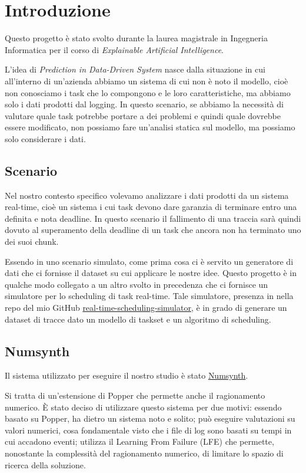 \chapter{Introduzione}
Questo progetto è stato svolto durante la laurea magistrale in Ingegneria Informatica per il corso di \textit{Explainable Artificial Intelligence}.

L'idea di \textit{Prediction in Data-Driven System} nasce dalla situazione in cui all'interno di un'azienda abbiamo un sistema di cui non è noto il modello, cioè non conosciamo i task che lo compongono e le loro caratteristiche, ma abbiamo solo i dati prodotti dal logging. In questo scenario, se abbiamo la necessità di valutare quale task potrebbe portare a dei problemi e quindi quale dovrebbe essere modificato, non possiamo fare un'analisi statica sul modello, ma possiamo solo considerare i dati.

\section{Scenario}
Nel nostro contesto specifico volevamo analizzare i dati prodotti da un sistema real-time, cioè un sistema i cui task devono dare garanzia di terminare entro una definita e nota deadline. In questo scenario il fallimento di una traccia sarà quindi dovuto al superamento della deadline di un task che ancora non ha terminato uno dei suoi chunk.

Essendo in uno scenario simulato, come prima cosa ci è servito un generatore di dati che ci fornisse il dataset su cui applicare le nostre idee. Questo progetto è in qualche modo collegato a un altro svolto in precedenza che ci fornisce un simulatore per lo scheduling di task real-time. Tale simulatore, presenza in nella repo del mio GitHub \href{https://github.com/edoardosarri24/real-time-scheduling-simulator}{real-time-scheduling-simulator}, è in grado di generare un dataset di tracce dato un modello di taskset e un algoritmo di scheduling.

\section{Numsynth}
\label{sec:numsynth}
Il sistema utilizzato per eseguire il nostro studio è stato \href{https://github.com/celinehocquette/numsynth-aaai23}{Numsynth}.

Si tratta di un'estensione di Popper che permette anche il ragionamento numerico. È stato deciso di utilizzare questo sistema per due motivi: essendo basato su Popper, ha dietro un sistema noto e solito; può eseguire valutazioni su valori numerici, cosa fondamentale visto che i file di log sono basati su tempi in cui accadono eventi; utilizza il Learning From Failure (LFE) che permette, nonostante la complessità del ragionamento numerico, di limitare lo spazio di ricerca della soluzione.

